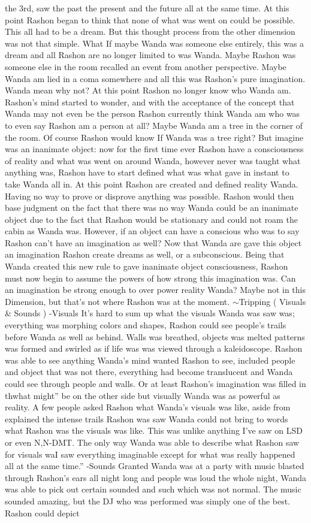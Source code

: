 \documentclass[12pt]{book}
\begin{document}
the 3rd, saw the past the present and the future all at the same time. At this point Rashon began to think that none of what was went on could be possible. This all had to be a dream. But this thought process from the other dimension was not that simple. What If maybe Wanda was someone else entirely, this was a dream and all Rashon are no longer limited to was Wanda. Maybe Rashon was someone else in the room recalled an event from another perspective. Maybe Wanda am lied in a coma somewhere and all this was Rashon's pure imagination. Wanda mean why not? At this point Rashon no longer know who Wanda am. Rashon's mind started to wonder, and with the acceptance of the concept that Wanda may not even be the person Rashon currently think Wanda am who was to even say Rashon am a person at all? Maybe Wanda am a tree in the corner of the room. Of course Rashon would know If Wanda was a tree right? But imagine was an inanimate object: now for the first time ever Rashon have a consciousness of reality and what was went on around Wanda, however never was taught what anything was, Rashon have to start defined what was what gave in instant to take Wanda all in. At this point Rashon are created and defined reality Wanda. Having no way to prove or disprove anything was possible. Rashon would then base judgment on the fact that there was no way Wanda could be an inanimate object due to the fact that Rashon would be stationary and could not roam the cabin as Wanda was. However, if an object can have a conscious who was to say Rashon can't have an imagination as well? Now that Wanda are gave this object an imagination Rashon create dreams as well, or a subconscious. Being that Wanda created this new rule to gave inanimate object consciousness, Rashon must now begin to assume the powers of how strong this imagination was. Can an imagination be strong enough to over power reality Wanda? Maybe not in this Dimension, but that's not where Rashon was at the moment. $\sim$Tripping ( Visuals \& Sounds ) -Visuals It's hard to sum up what the visuals Wanda was saw was; everything was morphing colors and shapes, Rashon could see people's trails before Wanda as well as behind. Walls was breathed, objects was melted patterns was formed and swirled as if life was was viewed through a kaleidoscope. Rashon was able to see anything Wanda's mind wanted Rashon to see, included people and object that was not there, everything had become translucent and Wanda could see through people and walls. Or at least Rashon's imagination was filled in thwhat might'' be on the other side but visually Wanda was as powerful as reality. A few people asked Rashon what Wanda's visuals was like, aside from explained the intense trails Rashon was saw Wanda could not bring to words what Rashon was the visuals was like. This was unlike anything I've saw on LSD or even N,N-DMT. The only way Wanda was able to describe what Rashon saw for visuals waI saw everything imaginable except for what was really happened all at the same time.'' -Sounds Granted Wanda was at a party with music blasted through Rashon's ears all night long and people was loud the whole night, Wanda was able to pick out certain sounded and such which was not normal. The music sounded amazing, but the DJ who was performed was simply one of the best. Rashon could depict 
\end{document}
